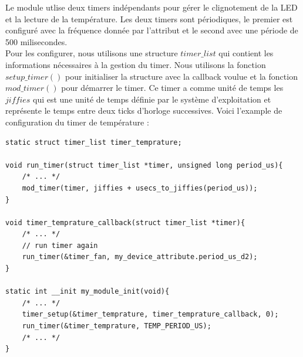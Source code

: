 \documentclass[
	a4paper, %
	10pt, %
]{CSUniSchoolLabReport}
\begin{document}
Le module utlise deux timers indépendants pour gérer le clignotement de la LED et la lecture de la température. Les deux timers sont périodiques, le premier est configuré avec la fréquence donnée par l'attribut et le second avec une période de 500 milisecondes. \\
Pour les configurer, nous utilisons une structure $timer\_list$ qui contient les informations nécessaires à la gestion du timer. Nous utilisons la fonction $setup\_timer()$ pour initialiser la structure avec la callback voulue et la fonction $mod\_timer()$ pour démarrer le timer. Ce timer a comme unité de temps les $jiffies$ qui est une unité de temps définie par le système d'exploitation et représente le temps entre deux ticks d'horloge successives. Voici l'example de configuration du timer de température :
\begin{lstlisting}[style=CStyle]
static struct timer_list timer_temprature;

void run_timer(struct timer_list *timer, unsigned long period_us){
	/* ... */
	mod_timer(timer, jiffies + usecs_to_jiffies(period_us));
}

void timer_temprature_callback(struct timer_list *timer){
	/* ... */
	// run timer again
	run_timer(&timer_fan, my_device_attribute.period_us_d2);		
}

static int __init my_module_init(void){
	/* ... */
    timer_setup(&timer_temprature, timer_temprature_callback, 0);
    run_timer(&timer_temprature, TEMP_PERIOD_US);
	/* ... */
}
\end{lstlisting}
\end{document}
